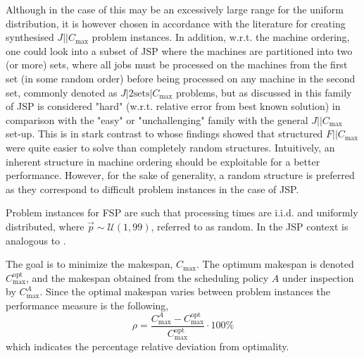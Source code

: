\documentclass[smallextended]{svjour3}
\begin{document}
Although in the case of   this may be an excessively large range for 
the uniform distribution, it is however chosen in accordance with the 
literature \citep{Demirkol98} for creating synthesised $J||C_{\max}$ problem 
instances. In addition, w.r.t. the machine ordering, one could look into a 
subset of JSP where the machines are partitioned into two (or more) sets, where 
all jobs must be processed on the machines from the first set (in some random 
order) before being processed on any machine in the second set, commonly 
denoted as $J|2\textrm{sets}|C_{\max}$ problems, but as discussed in 
\cite{orlib_swv} this family of JSP is considered "hard" (w.r.t. relative error 
from best known solution) in comparison with the "easy" or "unchallenging" 
family with the general $J||C_{\max}$ set-up. %
This is in stark contrast to \citet{Whitley} whose findings showed that 
structured $F||C_{\max}$ were quite easier to solve than completely random 
structures. 
Intuitively, an inherent structure in machine ordering should be exploitable 
for a better performance.  However, for the sake of generality, a random 
structure is preferred as they correspond to difficult problem instances in the 
case of JSP. 

Problem instances for FSP are such that processing times are i.i.d. and 
uniformly distributed,   where $\vec{p}\sim\mathcal{U}(1,99)$, 
referred to as random. In the JSP context   is analogous to 
. 

\begin{table}\centering
  \caption[Problem space distributions used in experimental studies.]{Problem 
    space distributions used in experimental studies. Note, problem instances 
    are synthetic and each problem space is i.i.d. 
  }\label{tbl:data:sim}
  
\end{table} 

The goal is to minimize the makespan, $C_{\max}$. The optimum 
makespan is denoted $C_{\max}^{\text{opt}}$, and the makespan obtained from the 
scheduling policy $A$ under inspection by $C_{\max}^{A}$. Since the optimal 
makespan varies between problem instances the performance measure is the 
following,
\begin{equation}\label{eq:ratio}
	\rho=\frac{C_{\max}^{A}-C_{\max}^{\text{opt}}}{C_{\max}^{\text{opt}}}\cdot
	100\%
\end{equation}
which indicates the percentage relative deviation from optimality. %
\end{document}
